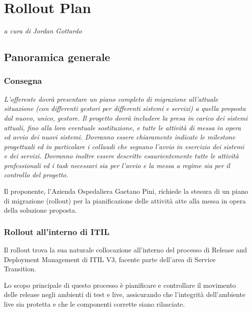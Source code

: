 
\chapter{Rollout Plan}
\begin{flushright}
\textit{a cura di \large{Jordan Gottardo}}
\end{flushright}
\label{cap:rolloutplan}


	\section{Panoramica generale}
    	\subsection{Consegna}
        	\textit{L’offerente dovrà presentare un piano completo di migrazione all’attuale situazione (con differenti gestori per differenti sistemi e servizi) a quella proposta dal nuovo, unico, gestore. Il progetto dovrà includere la presa in carico dei sistemi attuali, fino alla loro eventuale sostituzione, e tutte le attività di messa in opera ed avvio dei nuovi sistemi. Dovranno essere chiaramente indicate le milestone progettuali ed in particolare i collaudi che segnano l’avvio in esercizio dei sistemi e dei servizi. Dovranno inoltre essere descritte esaurientemente tutte le attività professionali ed i task necessari sia per l’avvio e la messa a regime sia per il controllo del progetto.}
            

			Il proponente, l'Azienda Ospedaliera Gaetano Pini, richiede la stesura di un piano di migrazione (rollout) per la pianificazione delle attività atte alla messa in opera della soluzione proposta.
            
		\subsection{Rollout all'interno di ITIL}
        	Il rollout trova la sua naturale collocazione all'interno del processo di Release and Deployment Management di ITIL V3, facente parte dell'area di Service Transition. 
            
            
            Lo scopo principale di questo processo è pianificare e controllare il movimento delle release negli ambienti di test e live, assicurando che l'integrità dell'ambiente live sia protetta e che le componenti corrette siano rilasciate.
            
